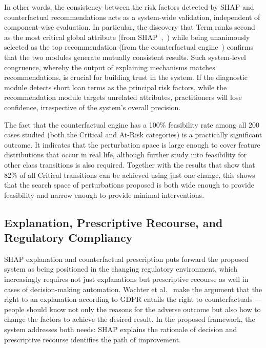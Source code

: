 In other words, the consistency between the risk factors detected by SHAP and counterfactual recommendations acts as a system-wide validation, independent of component-wise evaluation. In particular, the discovery that Term ranks second as the most critical global attribute (from SHAP~\cite{17},~\cite{18}) while being unanimously selected as the top recommendation (from the counterfactual engine~\cite{20}) confirms that the two modules generate mutually consistent results. Such system-level congruence, whereby the output of explaining mechanisms matches recommendations, is crucial for building trust in the system. If the diagnostic module detects short loan terms as the principal risk factors, while the recommendation module targets unrelated attributes, practitioners will lose confidence, irrespective of the system's overall precision.

The fact that the counterfactual engine has a 100\% feasibility rate among all 200 cases studied (both the Critical and At-Risk categories) is a practically significant outcome. It indicates that the perturbation space is large enough to cover feature distributions that occur in real life, although further study into feasibility for other class transitions is also required. Together with the results that show that 82\% of all Critical transitions can be achieved using just one change, this shows that the search space of perturbations proposed is both wide enough to provide feasibility and narrow enough to provide minimal interventions.

\subsection{Explanation, Prescriptive Recourse, and Regulatory Compliancy}

SHAP explanation and counterfactual prescription puts forward the proposed system as being positioned in the changing regulatory environment, which increasingly requires not just explanations but prescriptive recourse as well in cases of decision-making automation. Wachter et al.~\cite{19} make the argument that the right to an explanation according to GDPR entails the right to counterfactuals --- people should know not only the reasons for the adverse outcome but also how to change the factors to achieve the desired result. In the proposed framework, the system addresses both needs: SHAP explains the rationale of decision and prescriptive recourse identifies the path of improvement.

